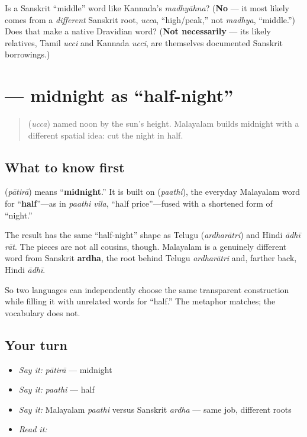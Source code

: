 \begin{tcolorbox}[breakable,colback=teal!4,colframe=teal!35!black,title={Before you move on}]
Is \textbf{} a Sanskrit \textquotedblleft{}middle\textquotedblright{} word like Kannada's \emph{madhyāhna}? (\textbf{No} — it most likely comes from a \emph{different} Sanskrit root, \emph{ucca}, \textquotedblleft{}high/peak,\textquotedblright{} not \emph{madhya}, \textquotedblleft{}middle.\textquotedblright{}) Does that make  a native Dravidian word? (\textbf{Not necessarily} — its likely relatives, Tamil \emph{ucci} and Kannada \emph{ucci}, are themselves documented Sanskrit borrowings.)
\end{tcolorbox}
\section[\texorpdfstring{\ml{പാതിരാ} (pātirā)}{പാതിരാ (pātirā)}]{ — midnight as “half-night”}

\label{lesson:ML-C17-paathira}



\begin{quote}
\textbf{} (\emph{ucca}) named noon by the sun’s height. Malayalam builds midnight with a different spatial idea: cut the night in half.
\end{quote}

\subsection*{What to know first}
\textbf{} (\emph{pātirā}) means “\textbf{midnight}.” It is built on \textbf{} (\emph{paathi}), the everyday Malayalam word for “\textbf{half}”—as in \emph{paathi vila}, “half price”—fused with a shortened form of “night.”

The result has the same “half-night” shape as Telugu \textbf{} (\emph{ardharātri}) and Hindi \emph{ādhī rāt}. The pieces are not all cousins, though. Malayalam \textbf{} is a genuinely different word from Sanskrit \textbf{ardha}, the root behind Telugu \emph{ardharātri} and, farther back, Hindi \emph{ādhī}.

So two languages can independently choose the same transparent construction while filling it with unrelated words for “half.” The metaphor matches; the vocabulary does not.

\subsection*{Your turn}
\begin{itemize}
\raggedright
  \item \emph{Say it:} \emph{pātirā} — midnight
  \item \emph{Say it:} \emph{paathi} — half
  \item \emph{Say it:} Malayalam \emph{paathi} versus Sanskrit \emph{ardha} — same job, different roots
  \item \emph{Read it:} \textbf{ }
\end{itemize}

